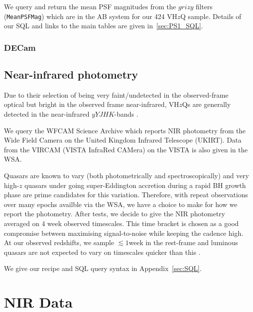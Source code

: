 \documentclass[usenatbib]{mnras}
\begin{document}
    We query and return the mean PSF magnitudes from the $grizy$ filters
    ({\tt MeanPSFMag}) which are in the AB system for our 424 VH$z$Q
    sample. Details of our SQL and links to the main tables are given
    in~\ref{sec:PS1_SQL}.
    
    \subsubsection{DECam} 
    


\subsection{Near-infrared photometry}
Due to their selection of being very faint/undetected in the
observed-frame optical but bright in the observed frame near-infrared,
VH$z$Qs are generally detected in the near-infrared $yYJHK$-bands
\citep[$\approx$0.98-2.38$\mu$m; e.g., ][]{Peth2011}.

We query the WFCAM Science Archive
\citep[\href{http://wsa.roe.ac.uk/}{WSA}; ][]{Hambly2008} which
reports NIR photometry from the Wide Field Camera \citep[WFCAM;
][]{Casali2007} on the United Kingdom Infrared Telescope (UKIRT).
Data from the VIRCAM (VISTA InfraRed CAMera) on the VISTA
\citep[Visible and Infrared Survey Telescope for Astronomy;
][]{Emerson2006, Dalton2006} is also given in the WSA.

Quasars are known to vary (both photometrically and spectroscopically)
and very high-$z$ quasars under going super-Eddington accretion during
a rapid BH growth phase are prime candidates for this variation.
Therefore, with repeat observations over many epochs availble via the
WSA, we have a choice to make for how we report the photometry. After
tests, we decide to give the NIR photometry averaged on 4 week
observed timescales. This time bracket is chosen as a good compromise
between maximising signal-to-noise while keeping the cadence high. At
our observed redshifts, we sample $\lesssim1$week in the rest-frame
and luminous quasars are not expected to vary on timescales quicker
than this \citep[e.g., ][]{Lawrence2016_ASPC}. 
 
We give our recipe and SQL query syntax in Appendix~\ref{sec:SQL}.


\section{NIR Data}
\end{document}
